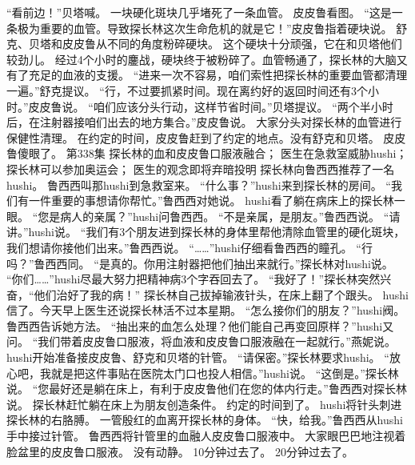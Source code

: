\documentclass[a4paper,12pt,UTF8,twoside]{ctexbook}
\begin{document}
        “看前边！”贝塔喊。  
        一块硬化斑块几乎堵死了一条血管。  
        皮皮鲁看图。  
        “这是一条极为重要的血管。导致探长林这次生命危机的就是它！”皮皮鲁指着硬块说。  
        舒克、贝塔和皮皮鲁从不同的角度粉碎硬块。  
        这个硬块十分顽强，它在和贝塔他们较劲儿。  
        经过4个小时的鏖战，硬块终于被粉碎了。血管畅通了，探长林的大脑又有了充足的血液的支援。  
        “进来一次不容易，咱们索性把探长林的重要血管都清理一遍。”舒克提议。  
        “行，不过要抓紧时间。现在离约好的返回时间还有3个小时。”皮皮鲁说。  
        “咱们应该分头行动，这样节省时间。”贝塔提议。  
        “两个半小时后，在注射器接咱们出去的地方集合。”皮皮鲁说。  
        大家分头对探长林的血管进行保健性清理。  
        在约定的时间，皮皮鲁赶到了约定的地点。没有舒克和贝塔。  
        皮皮鲁傻眼了。          第338集  
        探长林的血和皮皮鲁口服液融合；  
        医生在急救室威胁hushi；  
        探长林可以参加奥运会；  
        医生的观念即将弃暗投明    
        探长林向鲁西西推荐了一名hushi。  
        鲁西西叫那hushi到急救室来。  
        “什么事？”hushi来到探长林的房间。  
        “我们有一件重要的事想请你帮忙。”鲁西西对她说。  
        hushi看了躺在病床上的探长林一眼。  
        “您是病人的亲属？”hushi问鲁西西。  
        “不是亲属，是朋友。”鲁西西说。  
        “请讲。”hushi说。  
        “我们有3个朋友进到探长林的身体里帮他清除血管里的硬化斑块，我们想请你接他们出来。”鲁西西说。  
        “……”hushi仔细看鲁西西的瞳孔。  
        “行吗？”鲁西西同。  
        “是真的。你用注射器把他们抽出来就行。”探长林对hushi说。  
        “你们……”hushi尽最大努力把精神病3个字吞回去了。  
        “我好了！”探长林突然兴奋，“他们治好了我的病！”  
        探长林自己拔掉输液针头，在床上翻了个跟头。  
        hushi信了。今天早上医生还说探长林活不过本星期。  
        “怎么接你们的朋友？”hushi阀。  
        鲁西西告诉她方法。  
        “抽出来的血怎么处理？他们能自己再变回原样？”hushi又问。  
        “我们带着皮皮鲁口服液，将血液和皮皮鲁口服液融在一起就行。”燕妮说。  
        hushi开始准备接皮皮鲁、舒克和贝塔的针管。  
        “请保密。”探长林要求hushi。  
        “放心吧，我就是把这件事贴在医院太门口也投人相信。”hushi说。  
        “这倒是。”探长林说。  
        “您最好还是躺在床上，有利于皮皮鲁他们在您的体内行走。”鲁西西对探长林说。  
        探长林赶忙躺在床上为朋友创造条件。  
        约定的时间到了。  
        hushi将针头刺进探长林的右胳膊。  
        一管殷红的血离开探长林的身体。  
        “快，给我。”鲁西西从hushi手中接过针管。  
        鲁西西将针管里的血融人皮皮鲁口服液中。  
        大家眼巴巴地注视着脸盆里的皮皮鲁口服液。  
        没有动静。  
        10分钟过去了。  
        20分钟过去了。  
\end{document}
